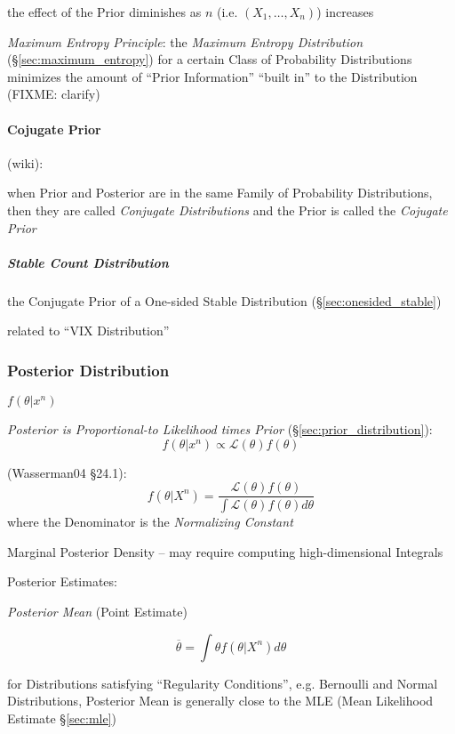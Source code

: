 the effect of the Prior diminishes as $n$ (i.e. $(X_1, \ldots, X_n)$) increases

\emph{Maximum Entropy Principle}: the \emph{Maximum Entropy Distribution}
(\S\ref{sec:maximum_entropy}) for a certain Class of Probability Distributions
minimizes the amount of ``Prior Information'' ``built in'' to the Distribution
(FIXME: clarify)



\paragraph{Cojugate Prior}\label{sec:conjugate_prior}\hfill

(wiki):

when Prior and Posterior are in the same Family of Probability Distributions,
then they are called \emph{Conjugate Distributions} and the Prior is called the
\emph{Cojugate Prior}



\subparagraph{Stable Count Distribution}\label{sec:stable_count}\hfill

the Conjugate Prior of a One-sided Stable Distribution
(\S\ref{sec:onesided_stable})

related to ``VIX Distribution''



\subsubsection{Posterior Distribution}\label{sec:posterior_distribution}

$f(\theta | x^n)$

\emph{Posterior is Proportional-to Likelihood times Prior}
(\S\ref{sec:prior_distribution}):
\[
  f(\theta | x^n) \propto \mathcal{L}(\theta)f(\theta)
\]

(Wasserman04 \S24.1):
\[
  f(\theta | X^n) = \frac{
    \mathcal{L}(\theta) f(\theta)
  }{
    \int \mathcal{L}(\theta) f(\theta) d\theta
  }
\]
where the Denominator is the \emph{Normalizing Constant}

Marginal Posterior Density -- may require computing high-dimensional Integrals

Posterior Estimates:

\emph{Posterior Mean} (Point Estimate)

\[
  \overline{\theta} = \int \theta f(\theta | X^n) d\theta
\]

for Distributions satisfying ``Regularity Conditions'', e.g. Bernoulli and
Normal Distributions, Posterior Mean is generally close to the MLE (Mean
Likelihood Estimate \S\ref{sec:mle})

